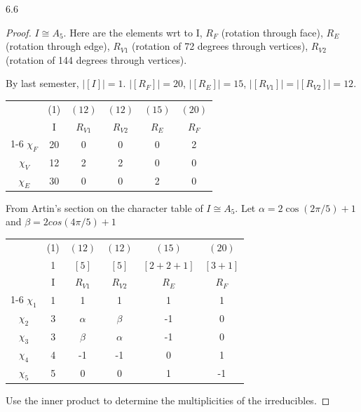 \documentclass{article}
\begin{document}
\begin{PROB}{6.6}\label{Problem 6.6.}
\end{PROB}
\begin{proof}
    $I \cong A_5$. Here are the elements wrt to I, $R_{F}$ (rotation through face), $R_E$ (rotation through edge), $R_{V1}$ (rotation of 72 degrees through vertices), $R_{V2}$ (rotation of 144 degrees through vertices). 
    
    By last semester, $|[I]| = 1$. $|[R_F]| = 20$, $|[R_{E}]| = 15$, $|[R_{V1}]| = |[R_{V2}]| = 12$. 
    

    \begin{tabular}{c | c c c c c }
        & (1) & $(12)$ & $(12)$ & $(15)$ & $(20)$   \\
        & I & $R_{V1}$ & $R_{V2}$ & $R_{E}$ & $R_F$   \\
        \cline{1-6}
        $\chi_{F}$ & 20 & 0 & 0 & 0 & 2\\
        $\chi_{V}$ & 12 & 2 & 2 & 0 & 0 \\
        $\chi_{E}$ & 30 & 0 & 0 & 2 & 0 \\
    \end{tabular}

    From Artin's section on the character table of $I \cong A_5$. Let $\alpha = 2\cos(2 \pi /5) + 1$ and $\beta  = 2cos(4 \pi /5) + 1$    

    \begin{tabular}{c | c c c c c }
        & (1) & $(12)$ & $(12)$ & $(15)$ & $(20)$   \\
        & 1 & $[5]$ & $[5]$ & $[2 + 2 + 1]$ & $[3 + 1]$   \\
        & I & $R_{V1}$ & $R_{V2}$ & $R_{E}$ & $R_F$   \\
        \cline{1-6}
        $\chi_{1}$ & 1 & 1 & 1 & 1 & 1\\
        $\chi_{2}$ & 3 & $\alpha$ & $\beta$ &  -1 & 0 \\
        $\chi_{3}$ & 3 & $\beta$  & $\alpha$  & -1 & 0 \\
        $\chi_{4}$ & 4 & -1 & -1 & 0 & 1 \\
        $\chi_{5}$ & 5 & 0 & 0 & 1 & -1 \\
    \end{tabular}


    Use the inner product to determine the multiplicities of the irreducibles.


\end{proof}
\end{document}
